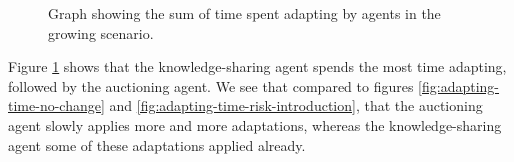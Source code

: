 \begin{figure}[H]
    \centering
        
    \caption{Graph showing the sum of time spent adapting by agents in the growing scenario.}
    \label{fig:adapting-time-growing}
\end{figure}

Figure \ref{fig:adapting-time-growing} shows that the knowledge-sharing agent spends the most time adapting, followed by the auctioning agent. We see that compared to figures \ref{fig:adapting-time-no-change} and \ref{fig:adapting-time-risk-introduction}, that the auctioning agent slowly applies more and more adaptations, whereas the knowledge-sharing agent some of these adaptations applied already. 
